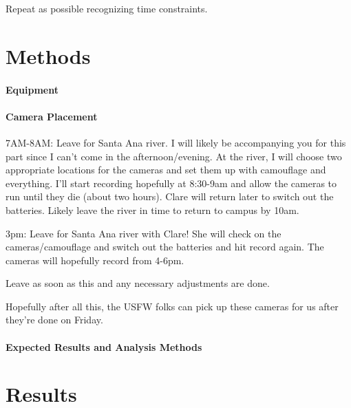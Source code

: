 \documentclass{tufte-handout}\usepackage[]{graphicx}\usepackage[]{color}
\begin{document}
Repeat as possible recognizing time constraints.

\section{Methods}

\paragraph{Equipment}

\paragraph{Camera Placement}

7AM-8AM: Leave for Santa Ana river. I will likely be accompanying you for this part since I can’t come in the afternoon/evening. 
At the river, I will choose two appropriate locations for the cameras and set them up with camouflage and everything. I’ll start recording hopefully at 8:30-9am and allow the cameras to run until they die (about two hours). Clare will return later to switch out the batteries.
Likely leave the river in time to return to campus by 10am.

3pm: Leave for Santa Ana river with Clare! She will check on the cameras/camouflage and switch out the batteries and hit record again. The cameras will hopefully record from 4-6pm.

Leave as soon as this and any necessary adjustments are done. 


Hopefully after all this, the USFW folks can pick up these cameras for us after they're done on Friday.

\paragraph{Expected Results and Analysis Methods}

\section{Results}
\end{document}
